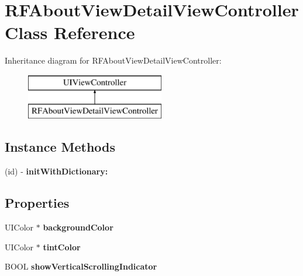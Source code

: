 \hypertarget{interface_r_f_about_view_detail_view_controller}{}\section{R\+F\+About\+View\+Detail\+View\+Controller Class Reference}
\label{interface_r_f_about_view_detail_view_controller}
Inheritance diagram for R\+F\+About\+View\+Detail\+View\+Controller\+:\begin{figure}[H]
\begin{center}
\leavevmode
\includegraphics[height=2.000000cm]{interface_r_f_about_view_detail_view_controller}
\end{center}
\end{figure}
\subsection*{Instance Methods}
\begin{DoxyCompactItemize}
\item 
\hypertarget{interface_r_f_about_view_detail_view_controller_a78f6b378472b617463af4674b05058c7}{}(id) -\/ {\bfseries init\+With\+Dictionary\+:}\label{interface_r_f_about_view_detail_view_controller_a78f6b378472b617463af4674b05058c7}

\end{DoxyCompactItemize}
\subsection*{Properties}
\begin{DoxyCompactItemize}
\item 
\hypertarget{interface_r_f_about_view_detail_view_controller_a3549cec4d3df1653646df80a3cfe63dd}{}U\+I\+Color $\ast$ {\bfseries background\+Color}\label{interface_r_f_about_view_detail_view_controller_a3549cec4d3df1653646df80a3cfe63dd}

\item 
\hypertarget{interface_r_f_about_view_detail_view_controller_aceb540ab6e63d3567045b2b59c1ee493}{}U\+I\+Color $\ast$ {\bfseries tint\+Color}\label{interface_r_f_about_view_detail_view_controller_aceb540ab6e63d3567045b2b59c1ee493}

\item 
\hypertarget{interface_r_f_about_view_detail_view_controller_a022b80445afdf0bb6c6e703be0b1c0f7}{}B\+O\+O\+L {\bfseries show\+Vertical\+Scrolling\+Indicator}\label{interface_r_f_about_view_detail_view_controller_a022b80445afdf0bb6c6e703be0b1c0f7}

\end{DoxyCompactItemize}


